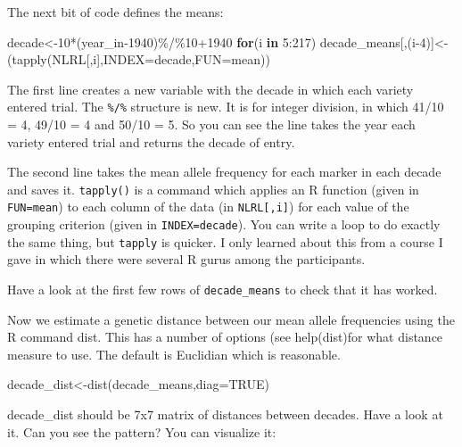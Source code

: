 \documentclass[
]{book}
\newenvironment{Shaded}{\begin{snugshade}}{\end{snugshade}}
\newcommand{\AttributeTok}[1]{\textcolor[rgb]{0.77,0.63,0.00}{#1}}
\newcommand{\ConstantTok}[1]{\textcolor[rgb]{0.00,0.00,0.00}{#1}}
\newcommand{\ControlFlowTok}[1]{\textcolor[rgb]{0.13,0.29,0.53}{\textbf{#1}}}
\newcommand{\DecValTok}[1]{\textcolor[rgb]{0.00,0.00,0.81}{#1}}
\newcommand{\FunctionTok}[1]{\textcolor[rgb]{0.00,0.00,0.00}{#1}}
\newcommand{\NormalTok}[1]{#1}
\newcommand{\OtherTok}[1]{\textcolor[rgb]{0.56,0.35,0.01}{#1}}
\newcommand{\SpecialCharTok}[1]{\textcolor[rgb]{0.00,0.00,0.00}{#1}}
\begin{document}
The next bit of code defines the means:

\begin{Shaded}
\begin{Highlighting}[]
\NormalTok{decade}\OtherTok{\textless{}{-}}\DecValTok{10}\SpecialCharTok{*}\NormalTok{(year\_in}\DecValTok{{-}1940}\NormalTok{)}\SpecialCharTok{\%/\%}\DecValTok{10}\SpecialCharTok{+}\DecValTok{1940}
\ControlFlowTok{for}\NormalTok{(i }\ControlFlowTok{in} \DecValTok{5}\SpecialCharTok{:}\DecValTok{217}\NormalTok{) decade\_means[,(i}\DecValTok{{-}4}\NormalTok{)]}\OtherTok{\textless{}{-}}\NormalTok{(}\FunctionTok{tapply}\NormalTok{(NLRL[,i],}\AttributeTok{INDEX=}\NormalTok{decade,}\AttributeTok{FUN=}\NormalTok{mean))}
\end{Highlighting}
\end{Shaded}

The first line creates a new variable with the decade in which each variety entered trial. The \texttt{\%/\%} structure is new. It is for integer division, in which 41/10 = 4, 49/10 = 4 and 50/10 = 5. So you can see the line takes the year each variety entered trial and returns the decade of entry.

The second line takes the mean allele frequency for each marker in each decade and saves
it. \texttt{tapply()} is a command which applies an R function (given in \texttt{FUN=mean}) to each column
of the data (in \texttt{NLRL{[},i{]}}) for each value of the grouping criterion (given in \texttt{INDEX=decade}). You can write a loop to do exactly the same thing, but \texttt{tapply} is quicker. I only learned about this from a course I gave in which there were several R gurus among the participants.

Have a look at the first few rows of \texttt{decade\_means} to check that it has worked.

Now we estimate a genetic distance between our mean allele frequencies using the R command dist. This has a number of options (see help(dist)for what distance measure to use. The default is Euclidian which is reasonable.

\begin{Shaded}
\begin{Highlighting}[]
\NormalTok{decade\_dist}\OtherTok{\textless{}{-}}\FunctionTok{dist}\NormalTok{(decade\_means,}\AttributeTok{diag=}\ConstantTok{TRUE}\NormalTok{)}
\end{Highlighting}
\end{Shaded}

decade\_dist should be 7x7 matrix of distances between decades. Have a look at it. Can you
see the pattern? You can visualize it:
\end{document}
